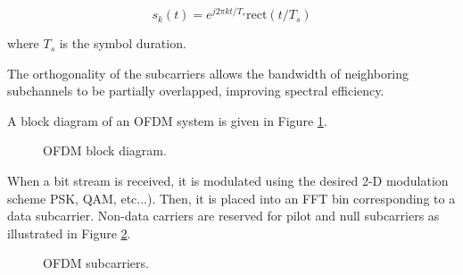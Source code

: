 \documentclass[conference]{IEEEtran}
\begin{document}
	 	\begin{equation}
	 		s_k(t) = e^{j2{\pi}kt/T_s}\text{rect}(t/T_s)
	 	\end{equation}
	 	
	 	where $T_s$ is the symbol duration.
	 	
	 	The orthogonality of the subcarriers allows the bandwidth of neighboring subchannels to be partially overlapped, improving spectral efficiency.
	 	
	 	A block diagram of an OFDM system is given in Figure \ref{fig::ofdm_block_diagram}.
		
	 	\begin{figure}[H]
	    		\centering
	    		\caption{OFDM block diagram.\cite {10.1007/978-981-16-2406-3_61}}
	    		\label{fig::ofdm_block_diagram}
		\end{figure}
		
		When a bit stream is received, it is modulated using the desired 2-D modulation scheme PSK, QAM, etc...). Then, it is placed into an FFT bin corresponding to a data subcarrier. Non-data carriers are reserved for pilot and null subcarriers as illustrated in Figure \ref{fig::ofdm_subcarriers}.
		
		\begin{figure}[H]
	    		\centering
	    		\caption{OFDM subcarriers. \cite {inproceedings}}
	    		\label{fig::ofdm_subcarriers}
		\end{figure}
		
\end{document}
